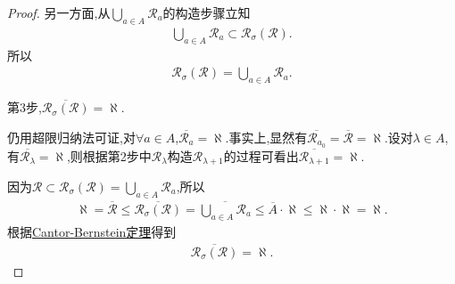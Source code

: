 \documentclass[../../main.tex]{subfiles}%
\begin{document}
\begin{proof}
另一方面,从$\bigcup\limits_{a\in A}\mathscr{R}_a$的构造步骤立知
\begin{align*}
\bigcup\limits_{a\in A}\mathscr{R}_a\subset\mathscr{R}_{\sigma}(\mathscr{R}).
\end{align*}
所以
\begin{align*}
\mathscr{R}_{\sigma}(\mathscr{R})=\bigcup\limits_{a\in A}\mathscr{R}_a.
\end{align*}

第3步,$\overline{\mathscr{R}_{\sigma}(\mathscr{R})}=\aleph$.

仍用超限归纳法可证,对$\forall a\in A$,$\overline{\mathscr{R}_a}=\aleph$.事实上,显然有$\overline{\mathscr{R}_{a_0}}=\overline{\mathscr{R}}=\aleph$.设对$\lambda\in A$,有$\overline{\mathscr{R}_{\lambda}}=\aleph$,则根据第2步中$\mathscr{R}_{\lambda}$构造$\mathscr{R}_{\lambda+1}$的过程可看出$\overline{\mathscr{R}_{\lambda+1}}=\aleph$.

因为$\mathscr{R}\subset\mathscr{R}_{\sigma}(\mathscr{R})=\bigcup\limits_{a\in A}\mathscr{R}_a$,所以
\begin{align*}
\aleph=\overline{\mathscr{R}}\leqslant\overline{\mathscr{R}_{\sigma}(\mathscr{R})}=\overline{\bigcup\limits_{a\in A}\mathscr{R}_a}\leqslant\overline{A}\cdot\aleph\leqslant\aleph\cdot\aleph=\aleph.
\end{align*}
根据\hyperref[Set Theory-theorem:Cantor-Bernstein定理]{Cantor-Bernstein定理}得到
\begin{align*}
\overline{\mathscr{R}_{\sigma}(\mathscr{R})}=\aleph.
\end{align*}
\end{proof}
\end{document}
